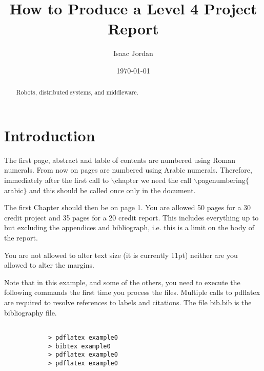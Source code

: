 \documentclass{l4proj}
\begin{document}
\title{How to Produce a Level 4 Project Report}
\author{Isaac Jordan}
\date{\today}
\maketitle

\begin{abstract}
Robots, distributed systems, and middleware.
\end{abstract}

\educationalconsent
%
%
\tableofcontents

\chapter{Introduction}
The first page, abstract and table of contents are numbered using Roman numerals. From now on pages are numbered
using Arabic numerals. Therefore, immediately after the first call to $\backslash$chapter we need the call
$\backslash$pagenumbering$\{$arabic$\}$ and this should be called once only in the document. 

The first Chapter should then be on page 1. You are allowed 50 pages for a 30 credit project and 35 pages for a 
20 credit report. This includes everything up to but excluding the appendices and bibliograph, i.e. this is a limit on
the body of the report.

You are not allowed to alter text size (it is currently 11pt) neither are you allowed to alter the margins.

Note that in this example, and some of the others, you need to execute the following commands the first time you process the files.
Multiple calls to pdflatex are required to resolve references to labels and citations. The file bib.bib is the bibliography file.

\begin{verbatim}

            > pdflatex example0
            > bibtex example0
            > pdflatex example0
            > pdflatex example0

\end{verbatim}

\end{document}
